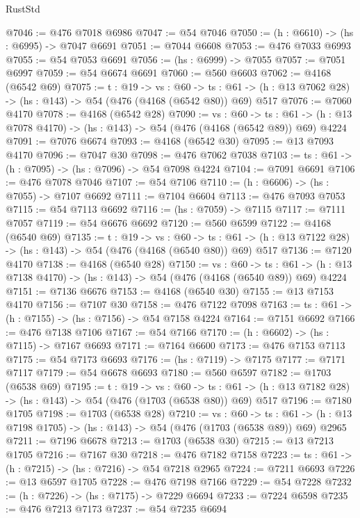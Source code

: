 \begin{lexlean}{RustStd}
\begin{coremodule}
@7046 := @476 @7018 @6986
@7047 := @54 @7046
@7050 := (h : @6610) -> (hs : @6995) -> @7047 @6691
@7051 := @7044 @6608
@7053 := @476 @7033 @6993
@7055 := @54 @7053 @6691
@7056 := (hs : @6999) -> @7055
@7057 := @7051 @6997
@7059 := @54 @6674 @6691
@7060 := @560 @6603
@7062 := @4168 (@6542 @69)
@7075 := {t : @19} ->
  {vs : @60} ->
  {ts : @61} -> (h : @13 @7062 @28) -> (hs : @143) -> @54 (@476 (@4168 (@6542 @80)) @69) @517
@7076 := @7060 @4170
@7078 := @4168 (@6542 @28)
@7090 := {vs : @60} ->
  {ts : @61} -> (h : @13 @7078 @4170) -> (hs : @143) -> @54 (@476 (@4168 (@6542 @89)) @69) @4224
@7091 := @7076 @6674
@7093 := @4168 (@6542 @30)
@7095 := @13 @7093 @4170
@7096 := @7047 @30
@7098 := @476 @7062 @7038
@7103 := {ts : @61} -> (h : @7095) -> (hs : @7096) -> @54 @7098 @4224
@7104 := @7091 @6691
@7106 := @476 @7078 @7046
@7107 := @54 @7106
@7110 := (h : @6606) -> (hs : @7055) -> @7107 @6692
@7111 := @7104 @6604
@7113 := @476 @7093 @7053
@7115 := @54 @7113 @6692
@7116 := (hs : @7059) -> @7115
@7117 := @7111 @7057
@7119 := @54 @6676 @6692
@7120 := @560 @6599
@7122 := @4168 (@6540 @69)
@7135 := {t : @19} ->
  {vs : @60} ->
  {ts : @61} -> (h : @13 @7122 @28) -> (hs : @143) -> @54 (@476 (@4168 (@6540 @80)) @69) @517
@7136 := @7120 @4170
@7138 := @4168 (@6540 @28)
@7150 := {vs : @60} ->
  {ts : @61} -> (h : @13 @7138 @4170) -> (hs : @143) -> @54 (@476 (@4168 (@6540 @89)) @69) @4224
@7151 := @7136 @6676
@7153 := @4168 (@6540 @30)
@7155 := @13 @7153 @4170
@7156 := @7107 @30
@7158 := @476 @7122 @7098
@7163 := {ts : @61} -> (h : @7155) -> (hs : @7156) -> @54 @7158 @4224
@7164 := @7151 @6692
@7166 := @476 @7138 @7106
@7167 := @54 @7166
@7170 := (h : @6602) -> (hs : @7115) -> @7167 @6693
@7171 := @7164 @6600
@7173 := @476 @7153 @7113
@7175 := @54 @7173 @6693
@7176 := (hs : @7119) -> @7175
@7177 := @7171 @7117
@7179 := @54 @6678 @6693
@7180 := @560 @6597
@7182 := @1703 (@6538 @69)
@7195 := {t : @19} ->
  {vs : @60} ->
  {ts : @61} -> (h : @13 @7182 @28) -> (hs : @143) -> @54 (@476 (@1703 (@6538 @80)) @69) @517
@7196 := @7180 @1705
@7198 := @1703 (@6538 @28)
@7210 := {vs : @60} ->
  {ts : @61} -> (h : @13 @7198 @1705) -> (hs : @143) -> @54 (@476 (@1703 (@6538 @89)) @69) @2965
@7211 := @7196 @6678
@7213 := @1703 (@6538 @30)
@7215 := @13 @7213 @1705
@7216 := @7167 @30
@7218 := @476 @7182 @7158
@7223 := {ts : @61} -> (h : @7215) -> (hs : @7216) -> @54 @7218 @2965
@7224 := @7211 @6693
@7226 := @13 @6597 @1705
@7228 := @476 @7198 @7166
@7229 := @54 @7228
@7232 := (h : @7226) -> (hs : @7175) -> @7229 @6694
@7233 := @7224 @6598
@7235 := @476 @7213 @7173
@7237 := @54 @7235 @6694

\end{coremodule}
\end{lexlean}
